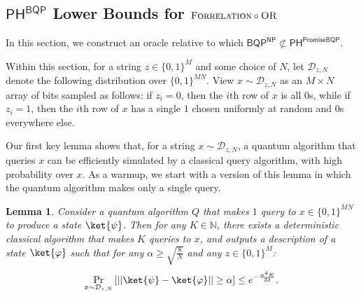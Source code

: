 \documentclass[11pt]{article}%
\newtheorem{lemma}[theorem]{Lemma}
\newcommand{\Naturals}{\mathbb{N}}
\newcommand{\OR}{\normalfont\textsc{OR}}
\newcommand{\Forrelation}{\normalfont\textsc{Forrelation}}
\begin{document}
\subsection{\texorpdfstring{$\mathsf{PH}^{\mathsf{BQP}}$}{PH\^{}BQP} Lower Bounds for \texorpdfstring{$\Forrelation \circ \OR$}{FORRELATION of ORs}}
In this section, we construct an oracle relative to which $\mathsf{BQP}^\mathsf{NP} \not\subset \mathsf{PH}^\mathsf{PromiseBQP}$.

Within this section, for a string $z \in \{0,1\}^M$ and some choice of $N$, let $\mathcal{D}_{z,N}$ denote the following distribution over $\{0,1\}^{MN}$. View $x \sim \mathcal{D}_{z,N}$ as an $M \times N$ array of bits sampled as follows: if $z_i = 0$, then the $i$th row of $x$ is all $0$s, while if $z_i = 1$, then the $i$th row of $x$ has a single $1$ chosen uniformly at random and $0$s everywhere else.

Our first key lemma shows that, for a string $x \sim \mathcal{D}_{z,N}$, a quantum algorithm that queries $x$ can be efficiently simulated by a classical query algorithm, with high probability over $x$. As a warmup, we start with a version of this lemma in which the quantum algorithm makes only a single query.

\begin{lemma}
\label{lem:sparse_aaronson_ambainis_single_query}
Consider a quantum algorithm $Q$ that makes $1$ query to $x \in \{0,1\}^{MN}$ to produce a state $\ket{\psi}$. Then for any $K \in \Naturals$, there exists a deterministic classical algorithm that makes $K$ queries to $x$, and outputs a description of a state $\ket{\varphi}$ such that for any $\alpha \ge \sqrt{\frac{8}{N}}$ and any $z \in \{0,1\}^M$:
\[
\Pr_{x \sim \mathcal{D}_{z,N}} \left[|| \ket{\psi} - \ket{\varphi}|| \ge \alpha \right] \le e^{-\frac{\alpha^4 K}{32}}.
\]
\end{lemma}
\end{document}
